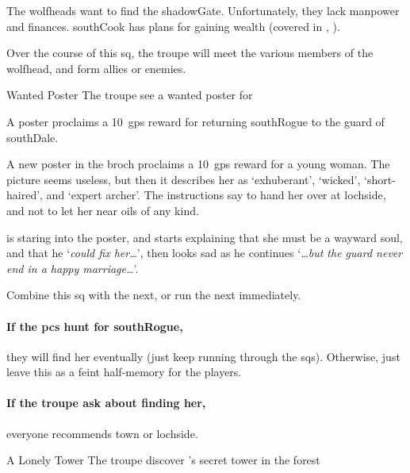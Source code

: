 \label{wolfHeads}

\noindent
The \glspl{wolfhead} want to find the \gls{shadowGate}.
Unfortunately, they lack manpower and finances.
\Gls{southCook} has plans for gaining wealth (covered in , ).

Over the course of this \gls{sq}, the troupe will meet the various members of the \gls{wolfhead}, and form allies or enemies.

{\squash Wanted Poster}%
{The troupe see a wanted poster for }%

A poster proclaims a 10~\glspl{gp} reward for returning \gls{southRogue} to the \gls{guard} of \gls{southDale}.

\begin{boxtext}
  A new poster in the \gls{broch} proclaims a 10~\glspl{gp} reward for a young woman.
  The picture seems useless, but then it describes her as `exhuberant', `wicked', `short-haired', and `expert archer'.
  The instructions say to hand her over at \gls{lochside}, and not to let her near oils of any kind.

   is staring into the poster, and starts explaining that she must be a wayward soul, and that he `\textit{could fix her\ldots}', then looks sad as he continues `\textit{\ldots but the \gls{guard} never end in a happy marriage\ldots}'.
\end{boxtext}

Combine this \gls{sq} with the next, or run the next immediately.

\paragraph{If the \glspl{pc} hunt for \gls{southRogue},}
they will find her eventually (just keep running through the \glspl{sq}).
Otherwise, just leave this as a feint half-memory for the players.

\paragraph{If the troupe ask about finding her,}
everyone recommends \gls{town} or \gls{lochside}.

{A Lonely Tower}%
{The troupe discover 's secret tower in the forest}%

\label{green_tower_sq}

